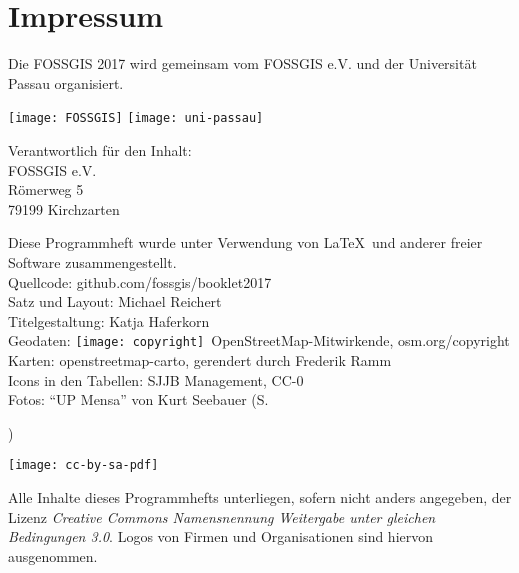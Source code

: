 \newpage
\section*{Impressum}
\label{impressum}
\pagestyle{cropmarksstyle}

\RaggedRight
Die FOSSGIS 2017 wird gemeinsam vom FOSSGIS e.V. und der Universität Passau organisiert.

\vspace{0.5em}
\texttt{[image: FOSSGIS]}
\hfill
\texttt{[image: uni-passau]}
\hfill

\vspace{0.5em}
{\small\noindent Verantwortlich für den Inhalt:\\
FOSSGIS e.V.\\
Römerweg 5\\
79199 Kirchzarten

\vspace{0.5em}
\noindent Diese Programmheft wurde unter Verwendung von \LaTeX\ und 
anderer freier Software zusammengestellt.\\
Quellcode: github.com/fossgis/booklet2017\\
\noindent Satz und Layout: Michael Reichert\\
Titelgestaltung: Katja Haferkorn\\
Geodaten: \texttt{[image: copyright]}~Open\-Street\-Map-Mitwirkende, osm.org/copyright\\
Karten: openstreetmap-carto, gerendert durch Frederik Ramm\\
Icons in den Tabellen: SJJB Management, CC-0\\
Fotos: "`UP Mensa"' von Kurt Seebauer (S.~\pageref{social-event}})

\vspace{1em}
\noindent \begin{minipage}[htbp]{0.2\textwidth}
\noindent\texttt{[image: cc-by-sa-pdf]}
\end{minipage}
\hfill
\begin{minipage}[hbtp]{0.74\textwidth}\RaggedRight
Alle Inhalte dieses Programmhefts unterliegen, sofern nicht anders angegeben, 
der Lizenz \emph{Creative Commons Namensnennung Weitergabe unter gleichen Bedingungen 3.0}.
Logos von Firmen und Organisationen sind hiervon ausgenommen.
\end{minipage}



